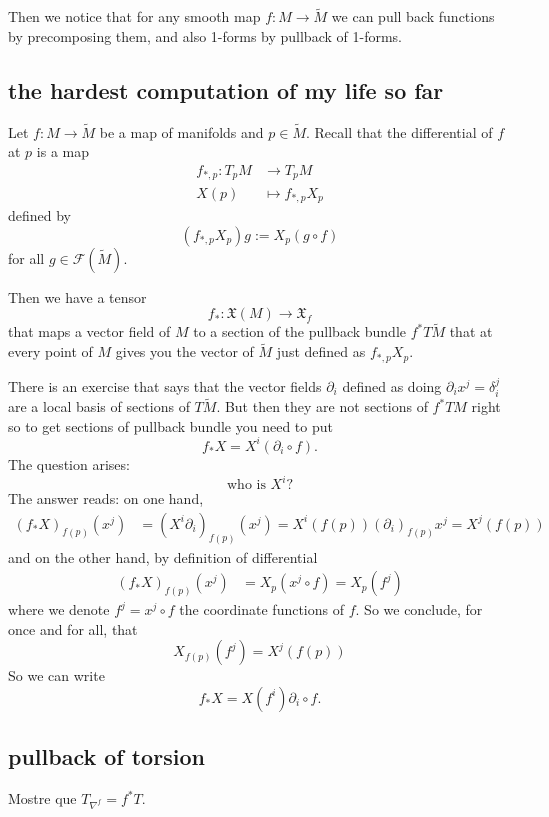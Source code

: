 Then we notice that for any smooth map \(f:M \to \widetilde{M}\) we can pull back functions by precomposing them, and also 1-forms by pullback of 1-forms.

\subsection{the hardest computation of my life so far}
Let \(f:M \to \tilde{M}\) be a map of manifolds and \(p \in \tilde{M}\).  Recall that the differential of \(f\) at \(p\) is a map
\begin{align*}
	f_{*,p}: T_pM &\longrightarrow T_pM \\
	X(p) &\longmapsto f_{*,p}X_p
\end{align*}
defined by
\[(f_{*,p}X_p)g:=X_p(g \circ f)\]
for all \(g \in \mathcal{F}(\tilde{M})\).

Then we have a tensor
\[f_*:\mathfrak{X}(M) \longrightarrow \mathfrak{X}_f\]
that maps a vector field of \(M\) to a section of the pullback bundle \(f^*T\tilde{M}\) that at every point  of \(M\) gives you the vector of \(\tilde{M}\) just defined as \(f_{*,p}X_p\).

There is an exercise that says that the vector fields \(\partial_i\) defined as doing \(\partial_i x^j=\delta_i^j\) are a local basis of sections of \(T\tilde{M}\). But then they are not sections of \(f^*TM\) right so to get sections of pullback bundle you need to put
\[f_* X=X^i(\partial_i \circ f).\]
The question arises:
\[\text{who is } X^i\text{?} \]
The answer reads: on one hand,
\begin{align*}
	(f_*X)_{f(p)}(x^j)&=(X^i \partial_i)_{f(p)}(x^j)=X^i(f(p))(\partial_i)_{f(p)}x^j=X^j(f(p))
\end{align*}
and on the other hand, by definition of differential
\begin{align*}
	(f_*X)_{f(p)}(x^j)&=X_p(x^j\circ f)=X_p(f^j)
\end{align*}
where we denote \(f^j=x^j \circ f\) the coordinate functions of \(f\). So we conclude, for once and for all, that
\[X_{f(p)}(f^j)=X^j(f(p))\]
So we can write
\[f_*X=X(f^i)\partial_i \circ f .\]

\subsection{pullback of torsion}

\begin{exercise}\leavevmode
Mostre que \(T_{\nabla^f}=f^*T\).
\end{exercise}


